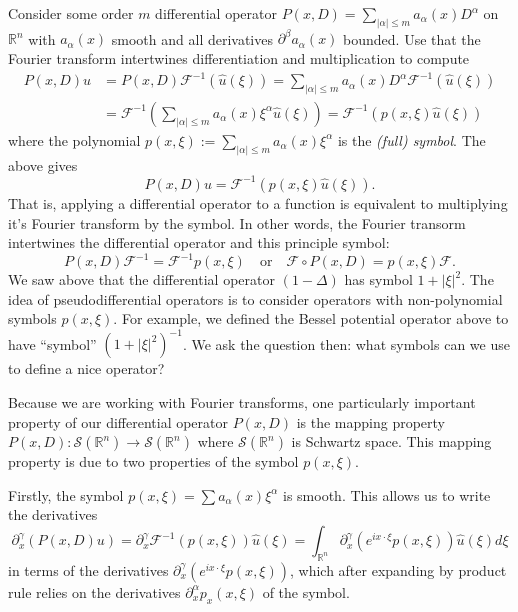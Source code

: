\documentclass[
]{article}
\begin{document}
Consider some order \(m\) differential operator
\(P(x,D) = \sum_{|\alpha| \leq m} a_{\alpha}(x)D^{\alpha}\) on
\(\mathbb{R}^n\) with \(a_{\alpha}(x)\) smooth and all derivatives
\(\partial^{\beta}a_{\alpha}(x)\) bounded. Use that the Fourier
transform intertwines differentiation and multiplication to compute
\begin{align}
    P(x,D)u
    &= P(x,D)\mathcal{F}^{-1}(\hat{u}(\xi))
    = \sum_{|\alpha| \leq m} a_{\alpha}(x)D^{\alpha}\mathcal{F}^{-1}(\hat{u}(\xi))\\\
    &= \mathcal{F}^{-1}\left(\sum_{|\alpha| \leq m} a_{\alpha}(x)\xi^{\alpha}\hat{u}(\xi)\right)
    = \mathcal{F}^{-1}\left(p(x,\xi)\hat{u}(\xi)\right)
\end{align} where the polynomial
\(p(x,\xi) := \sum_{|\alpha| \leq m} a_{\alpha}(x) \xi^{\alpha}\) is the
\emph{(full) symbol}. The above gives \[
    P(x,D)u = \mathcal{F}^{-1}\left(p(x,\xi)\hat{u}(\xi)\right).
\] That is, applying a differential operator to a function is equivalent
to multiplying it's Fourier transform by the symbol. In other words, the
Fourier transorm intertwines the differential operator and this
principle symbol: \[
    P(x,D)\mathcal{F}^{-1} = \mathcal{F}^{-1}p(x,\xi) 
    \quad \text{or} \quad
    \mathcal{F} \circ P(x,D) = p(x,\xi) \mathcal{F}.
\] We saw above that the differential operator \((1-\Delta)\) has symbol
\(1+|\xi|^2\). The idea of pseudodifferential operators is to consider
operators with non-polynomial symbols \(p(x, \xi)\). For example, we
defined the Bessel potential operator above to have ``symbol''
\((1+|\xi|^2)^{-1}\). We ask the question then: what symbols can we use
to define a nice operator?

Because we are working with Fourier transforms, one particularly
important property of our differential operator \(P(x,D)\) is the
mapping property
\(P(x,D): \mathscr{S}(\mathbb{R}^n) \to \mathscr{S}(\mathbb{R}^n)\)
where \(\mathscr{S}(\mathbb{R}^n)\) is Schwartz space. This mapping
property is due to two properties of the symbol \(p(x, \xi)\).

Firstly, the symbol \(p(x,\xi) = \sum a_{\alpha}(x)\xi^{\alpha}\) is
smooth. This allows us to write the derivatives \[
    \partial_x^{\gamma}(P(x,D)u)
    = \partial_x^{\gamma} \mathcal{F}^{-1}(p(x, \xi))\hat{u}(\xi)
    = \int_{\mathbb{R}^n} \partial_x^{\gamma}(e^{ix \cdot \xi}p(x, \xi))\hat{u}(\xi)d\xi
\] in terms of the derivatives
\(\partial_x^{\gamma}(e^{ix \cdot \xi}p(x, \xi))\), which after
expanding by product rule relies on the derivatives
\(\partial_x^{\alpha} p_x(x,\xi)\) of the symbol.
\end{document}
